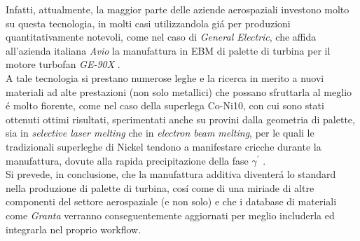 \documentclass{article}
\begin{document}
    Infatti, attualmente, la maggior parte delle aziende aerospaziali investono molto su questa tecnologia, 
    in molti casi utilizzandola giá per produzioni quantitativamente notevoli, come 
    nel caso di \textit{General Electric}, che affida all'azienda italiana \textit{Avio} la manufattura
    in EBM di palette di turbina per il motore turbofan \textit{GE-90X} \autocite{GE90X_EBM}. \\

    A tale tecnologia si prestano numerose leghe e la ricerca in merito a nuovi materiali ad alte prestazioni (non
    solo metallici)
    che possano sfruttarla al meglio é molto fiorente, come nel caso della superlega Co-Ni10, 
    con cui sono stati ottenuti ottimi risultati, sperimentati anche su provini
    dalla geometria di palette, sia in 
    \textit{selective laser melting} che in \textit{electron beam melting}, per le quali
    le tradizionali superleghe di Nickel tendono a manifestare cricche durante la
    manufattura, dovute alla rapida precipitazione della fase $\gamma^{'}$ \autocite{Co_Ni_EBM}. \\ 

    Si prevede, in conclusione, che la manufattura additiva diventerá lo standard nella produzione di palette
    di turbina, cosí come di una miriade di 
    altre componenti del settore aerospaziale (e non solo) e che i database di materiali come \textit{Granta} verranno conseguentemente aggiornati per 
    meglio includerla ed integrarla nel proprio workflow. 

    

    \clearpage

    \printbibliography
    
\end{document}
